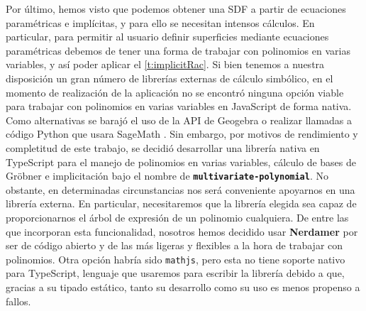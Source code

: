 Por último, hemos visto que podemos obtener una SDF a partir de ecuaciones paramétricas e implícitas, y para ello se necesitan intensos cálculos. En particular, para permitir al usuario definir superficies mediante ecuaciones paramétricas debemos de tener una forma de trabajar con polinomios en varias variables, y así poder aplicar el \autoref{t:implicitRac}. Si bien tenemos a nuestra disposición un gran número de librerías externas de cálculo simbólico, en el momento de realización de la aplicación no se encontró ninguna opción viable para trabajar con polinomios en varias variables en JavaScript de forma nativa. Como alternativas se barajó el uso de la API de Geogebra \cite{geogebra} o realizar llamadas a código Python que usara SageMath \cite{sage}. Sin embargo, por motivos de rendimiento y completitud de este trabajo, se decidió desarrollar una librería nativa en TypeScript para el manejo de polinomios en varias variables, cálculo de bases de Gröbner e implicitación bajo el nombre de \textbf{\texttt{multivariate-polynomial}}. No obstante, en determinadas circunstancias nos será conveniente apoyarnos en una librería externa. En particular, necesitaremos que la librería elegida sea capaz de proporcionarnos el árbol de expresión de un polinomio cualquiera. De entre las que incorporan esta funcionalidad, nosotros hemos decidido usar \textbf{Nerdamer} \cite{nerdamer} por ser de código abierto y de las más ligeras y flexibles a la hora de trabajar con polinomios. Otra opción habría sido \texttt{mathjs}, pero esta no tiene soporte nativo para TypeScript, lenguaje que usaremos para escribir la librería debido a que, gracias a su tipado estático, tanto su desarrollo como su uso es menos propenso a fallos.




